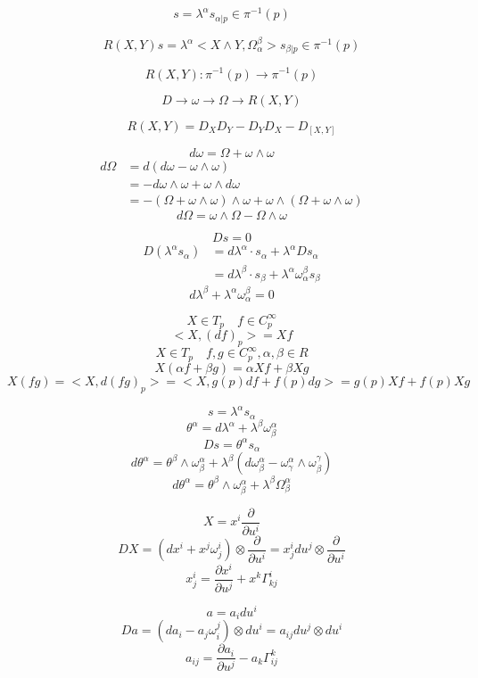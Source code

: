 \documentclass[12pt,a4paper]{article}
\begin{document}
\[
s = \lambda^{\alpha}s_{\alpha|p} \in \pi^{-1}(p)
\]

\[
R(X,Y)s = \lambda^{\alpha}<X\wedge Y, \Omega^{\beta}_{\alpha}>s_{\beta|p} \in \pi^{-1}(p)
\]

\[
R(X,Y): \pi^{-1}(p) \rightarrow  \pi^{-1}(p)
\]

\[
D \rightarrow \omega \rightarrow \Omega \rightarrow R(X,Y)
\]

\[
R(X,Y) = D_XD_Y - D_YD_X - D_{[X,Y]}
\]

\[
d\omega = \Omega + \omega \wedge \omega
\]
\begin{align*}
d\Omega &= d(d\omega- \omega \wedge \omega)\\
 & = -d\omega \wedge \omega + \omega \wedge d\omega \\
 & = -(\Omega + \omega \wedge \omega)\wedge \omega + \omega \wedge (\Omega + \omega \wedge \omega)
\end{align*}
\[
d\Omega = \omega \wedge \Omega - \Omega \wedge \omega
\]

\[
Ds = 0\]
\begin{align*}
D(\lambda^{\alpha}s_{\alpha}) &= d\lambda^{\alpha}\cdot s_{\alpha} + \lambda^{\alpha} Ds_{\alpha} \\
& =  d\lambda^{\beta}\cdot s_{\beta} + \lambda^{\alpha} \omega^{\beta}_{\alpha} s_{\beta}
\end{align*}
\[
d\lambda^{\beta} + \lambda^{\alpha} \omega^{\beta}_{\alpha} = 0
\]

\[
X \in T_p \quad f \in C^{\infty}_p
\]
\[
<X,(df)_p> = Xf
\]
\[
X \in T_p \quad f,g \in C^{\infty}_p, \alpha,\beta \in R
\]
\[
X(\alpha f+\beta g) = \alpha Xf + \beta Xg
\]
\[
X(fg) = <X,d(fg)_p> = <X,g(p)df+f(p)dg> = g(p)Xf+f(p)Xg
\]


\[
s = \lambda^{\alpha}s_{\alpha}
\]
\[
\theta^{\alpha} = d\lambda^{\alpha} + \lambda^{\beta}\omega^{\alpha}_{\beta}
\]
\[
Ds = \theta^{\alpha}s_{\alpha}
\]
\[
d\theta^{\alpha} = \theta^{\beta}\wedge \omega^{\alpha}_{\beta} + \lambda^{\beta}(d\omega^{\alpha}_{\beta} - \omega^{\alpha}_{\gamma}\wedge \omega^{\gamma}_{\beta})
\]
\[
d\theta^{\alpha} = \theta^{\beta}\wedge \omega^{\alpha}_{\beta} + \lambda^{\beta}\Omega^{\alpha}_{\beta}
\]


\[
X = x^i \frac{\partial}{\partial u^i}
\]
\[
DX = (dx^i + x^j\omega^i_j)\otimes \frac{\partial}{\partial u^i} = x^i_j du^j \otimes \frac{\partial}{\partial u^i}
\]
\[
x^i_j =  \frac{\partial x^i}{\partial u^j} + x^k\Gamma^i_{kj}
\]

\[
a = a_idu^i
\]
\[
Da = (da_i - a_j\omega^j_i) \otimes du^i = a_{ij} du^j \otimes du^i
\]
\[
a_{ij} = \frac{\partial a_i}{\partial u^j} - a_k\Gamma^k_{ij}
\]
\end{document}
